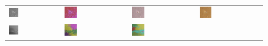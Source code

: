 \begin{figure}[h!]
	\begin{tabular}{C{0.24\textwidth}C{0.24\textwidth}C{0.24\textwidth}C{0.24\textwidth}}
		\includegraphics[width=0.2\textwidth]{images/p03/p03_01.png} &
		\includegraphics[width=0.2\textwidth]{images/gen/pooling_layers/p03_01.png_1.png} &
		\includegraphics[width=0.2\textwidth]{images/gen/pooling_layers/p03_01.png_2.png} &
		\includegraphics[width=0.2\textwidth]{images/gen/pooling_layers/p03_01.png_4.png} \\
		\includegraphics[width=0.2\textwidth]{images/p03/p03_02.png} &
		\includegraphics[width=0.2\textwidth]{images/gen/pooling_layers/p03_02.png_1.png} &
		\includegraphics[width=0.2\textwidth]{images/gen/pooling_layers/p03_02.png_2.png} &

\end{tabular}
\end{figure}
